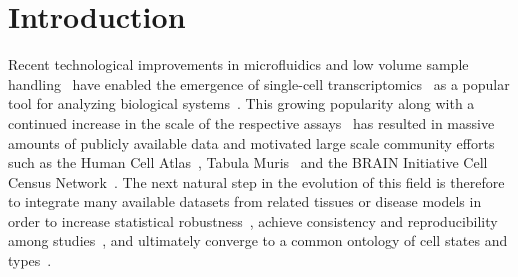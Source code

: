 \section{Introduction}
Recent technological improvements in microfluidics and low volume sample handling~\cite{tanay2017scaling} have enabled the emergence of single-cell transcriptomics~\cite{dropseq, zheng2017massively} as a popular tool for analyzing biological systems~\cite{Semrau2017, Gaublomme2015, Patel2014}. This growing popularity along with a continued increase in the scale of the respective assays~\cite{angerer} has resulted in massive amounts of publicly available data and motivated large scale community efforts such as the Human Cell Atlas~\cite{HCA}, Tabula Muris~\cite{quake2018single} and the BRAIN Initiative Cell Census Network~\cite{biccn}. The next natural step in the evolution of this field is therefore to integrate many available datasets from related tissues or disease models in order to increase statistical robustness~\cite{boost}, achieve consistency and reproducibility among studies~\cite{MNN,seurat}, and ultimately converge to a common ontology of cell states and types~\cite{HCA, wagner2016revealing}. 

